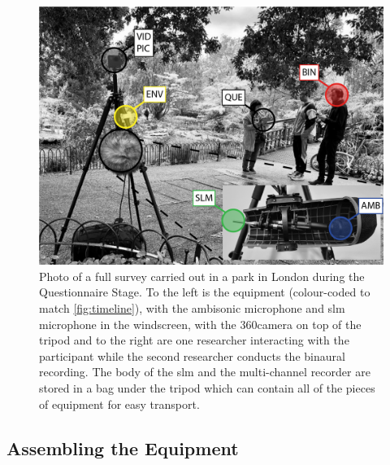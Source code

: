  \begin{figure}[h]
   \centering
   \includegraphics[width=\textwidth]{Figures/RegentsParkSurvey_V2-2}
   \caption{Photo of a full survey carried out in a park in London during the Questionnaire Stage. To the left is the equipment (colour-coded to match \cref{fig:timeline}), with the ambisonic microphone and \gls{slm} microphone in the windscreen, with the 360\degree camera on top of the tripod and to the right are one researcher interacting with the participant while the second researcher conducts the binaural recording. The body of the \gls{slm} and the multi-channel recorder are stored in a bag under the tripod which can contain all of the pieces of equipment for easy transport. \label{fig:survey-pic}}
 \end{figure}

 \subsection{Assembling the Equipment}

